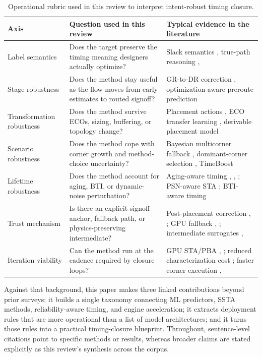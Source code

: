 \documentclass[num-refs]{wiley-article}
\begin{document}
    \begin{table}[tbp]
    \centering
    \caption{Operational rubric used in this review to interpret intent-robust timing closure.}
    \label{tab:wiley-2}
    \small
    \begin{tabularx}{\textwidth}{>{\raggedright\arraybackslash}X >{\raggedright\arraybackslash}X >{\raggedright\arraybackslash}X}
    \toprule
    \textbf{Axis} & \textbf{Question used in this review} & \textbf{Typical evidence in the literature} \\
    \midrule
    Label semantics & Does the target preserve the timing meaning designers actually optimize? & Slack semantics \cite{ref50}, true-path reasoning \cite{ref37}, \cite{ref40} \\
    Stage robustness & Does the method stay useful as the flow moves from early estimates to routed signoff? & GR-to-DR correction \cite{ref10}, optimization-aware preroute prediction \cite{ref8} \\
    Transformation robustness & Does the method survive ECOs, sizing, buffering, or topology change? & Placement actions \cite{ref1}, ECO transfer learning \cite{ref19}, derivable placement model \cite{ref3} \\
    Scenario robustness & Does the method cope with corner growth and method-choice uncertainty? & Bayesian multicorner fallback \cite{ref16}, dominant-corner selection \cite{ref28}, TimeBoost \cite{ref9} \\
    Lifetime robustness & Does the method account for aging, BTI, or dynamic-noise perturbation? & Aging-aware timing \cite{ref14}, \cite{ref15}, \cite{ref23}; PSN-aware STA \cite{ref12}; BTI-aware timing \cite{ref44} \\
    Trust mechanism & Is there an explicit signoff anchor, fallback path, or physics-preserving intermediate? & Post-placement correction \cite{ref25}, \cite{ref13}; GPU fallback \cite{ref21}, \cite{ref22}; intermediate surrogates \cite{ref17}, \cite{ref29} \\
    Iteration viability & Can the method run at the cadence required by closure loops? & GPU STA/PBA \cite{ref21}, \cite{ref22}; reduced characterization cost \cite{ref4}; faster corner execution \cite{ref16}, \cite{ref28} \\
    \bottomrule
    \end{tabularx}
    \end{table}


    Against that background, this paper makes three linked contributions beyond prior surveys: it builds a single taxonomy connecting ML predictors, SSTA methods, reliability-aware timing, and engine acceleration; it extracts deployment rules that are more operational than a list of model architectures; and it turns those rules into a practical timing-closure blueprint. Throughout, sentence-level citations point to specific methods or results, whereas broader claims are stated explicitly as this review's synthesis across the corpus.
\end{document}
